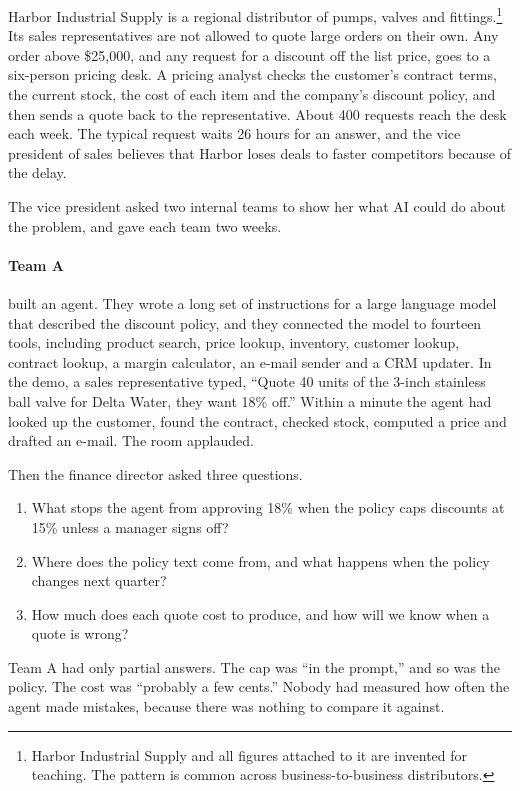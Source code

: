 Harbor Industrial Supply is a regional distributor of pumps, valves and fittings.\footnote{Harbor Industrial Supply and all figures attached to it are invented for teaching. The pattern is common across business-to-business distributors.} Its sales representatives are not allowed to quote large orders on their own. Any order above \$25{,}000, and any request for a discount off the list price, goes to a six-person pricing desk. A pricing analyst checks the customer's contract terms, the current stock, the cost of each item and the company's discount policy, and then sends a quote back to the representative. About 400 requests reach the desk each week. The typical request waits 26 hours for an answer, and the vice president of sales believes that Harbor loses deals to faster competitors because of the delay.

The vice president asked two internal teams to show her what AI could do about the problem, and gave each team two weeks.

\paragraph{Team A} built an agent. They wrote a long set of instructions for a large language model that described the discount policy, and they connected the model to fourteen tools, including product search, price lookup, inventory, customer lookup, contract lookup, a margin calculator, an e-mail sender and a CRM updater. In the demo, a sales representative typed, ``Quote 40 units of the 3-inch stainless ball valve for Delta Water, they want 18\% off.'' Within a minute the agent had looked up the customer, found the contract, checked stock, computed a price and drafted an e-mail. The room applauded.

Then the finance director asked three questions. 
\begin{enumerate}
\item What stops the agent from approving 18\% when the policy caps discounts at 15\% unless a manager signs off? 
\item Where does the policy text come from, and what happens when the policy changes next quarter? 
\item How much does each quote cost to produce, and how will we know when a quote is wrong? 
\end{enumerate}

Team A had only partial answers. The cap was ``in the prompt,'' and so was the policy. The cost was ``probably a few cents.'' Nobody had measured how often the agent made mistakes, because there was nothing to compare it against.

